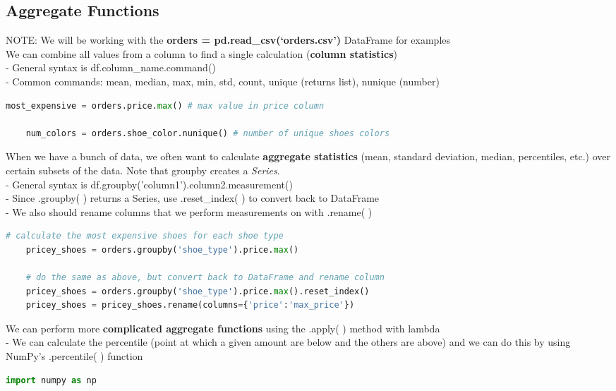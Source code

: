 \documentclass[11pt, a4paper]{article}
\begin{document}
\begin{spacing}{1.1}
	\subsection{Aggregate Functions}
	NOTE: We will be working with the \textbf{orders = pd.read\_csv(`orders.csv')} DataFrame for examples \vspace*{3mm} \\
	We can combine all values from a column to find a single calculation (\textbf{column statistics}) \\
	\hspace*{4mm} - General syntax is df.column\_name.command() \\
	\hspace*{4mm} - Common commands: mean, median, max, min, std, count, unique (returns list), nunique (number)
	\begin{lstlisting}[language=Python]
	most_expensive = orders.price.max() # max value in price column
	
	num_colors = orders.shoe_color.nunique() # number of unique shoes colors \end{lstlisting}\vspace*{1mm}
	When we have a bunch of data, we often want to calculate \textbf{aggregate statistics} (mean, standard deviation, median, percentiles, etc.) over certain subsets of the data. Note that groupby creates a \textit{Series}.\\
	\hspace*{4mm} - General syntax is df.groupby('column1').column2.measurement() \\
	\hspace*{4mm} - Since .groupby( ) returns a Series, use .reset\_index( ) to convert back to DataFrame \\
	\hspace*{4mm} - We also should rename columns that we perform measurements on with .rename( )
	\begin{lstlisting}[language=Python]
	# calculate the most expensive shoes for each shoe type
	pricey_shoes = orders.groupby('shoe_type').price.max() 
	
	# do the same as above, but convert back to DataFrame and rename column
	pricey_shoes = orders.groupby('shoe_type').price.max().reset_index()	
	pricey_shoes = pricey_shoes.rename(columns={'price':'max_price'}) \end{lstlisting}\vspace*{1mm}
	We can perform more \textbf{complicated aggregate functions} using the .apply( ) method with lambda \\
	\hspace*{4mm} - We can calculate the percentile (point at which a given amount are below and the others are above) \hspace*{7mm} and we can do this by using NumPy's .percentile( ) function
	\begin{lstlisting}[language=Python]
	import numpy as np
	

\end{lstlisting}
\end{spacing}
\end{document}
